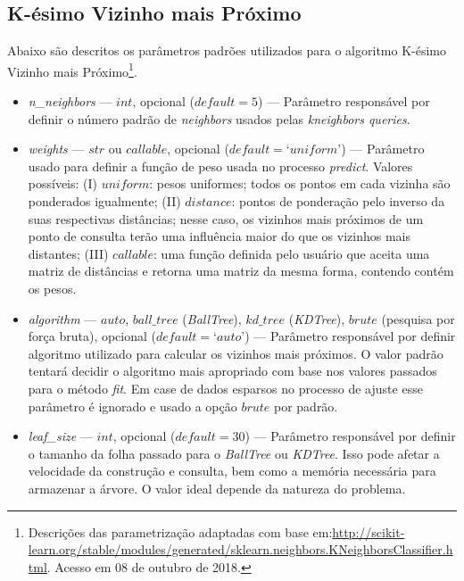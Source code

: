 \documentclass[
	12pt,				%
	oneside,			%
	a4paper,			%
	english,			%
	brazil				%
	]{abntex2ppgsi}
\begin{document}
{{{\begin{apendicesenv}
\section{K-ésimo Vizinho mais Próximo}

Abaixo são descritos os parâmetros padrões utilizados para o algoritmo K-ésimo Vizinho mais Próximo\footnote{Descrições das parametrização adaptadas com base em:\url{http://scikit-learn.org/stable/modules/generated/sklearn.neighbors.KNeighborsClassifier.html}. Acesso em 08 de outubro de 2018.}.

\begin{itemize}

\item \textit{n\_neighbors} --- $int$, opcional ($default = 5$) --- Parâmetro responsável por definir o número padrão de \textit{neighbors} usados pelas \textit{kneighbors queries}.

\item \textit{weights} --- $str$ ou $callable$, opcional ($default = ‘uniform’$) --- Parâmetro usado para definir a função de peso usada no processo \textit{predict}. Valores possíveis: (I) $uniform$: pesos uniformes; todos os pontos em cada vizinha são ponderados igualmente; (II) $distance$: pontos de ponderação pelo inverso da suas respectivas distâncias; nesse caso, os vizinhos mais próximos de um ponto de consulta terão uma influência maior do que os vizinhos mais distantes; (III) $callable$: uma função definida pelo usuário que aceita uma matriz de distâncias e retorna uma matriz da mesma forma, contendo contém os pesos.

\item \textit{algorithm} --- $auto$, $ball\_tree$ (\textit{BallTree}), $kd\_tree$ (\textit{KDTree}), $brute$ (pesquisa por força bruta), opcional ($default = ‘auto’$) --- Parâmetro responsável por definir algoritmo utilizado para calcular os vizinhos mais próximos. O valor padrão tentará decidir o algoritmo mais apropriado com base nos valores passados para o método \textit{fit}. Em case de dados esparsos no processo de ajuste esse parâmetro é ignorado e usado a opção $brute$ por padrão.

\item \textit{leaf\_size} --- $int$, opcional ($default = 30$) --- Parâmetro responsável por definir o tamanho da folha passado para o \textit{BallTree} ou \textit{KDTree}. Isso pode afetar a velocidade da construção e consulta, bem como a memória necessária para armazenar a árvore. O valor ideal depende da natureza do problema.


\end{itemize}
\end{apendicesenv}}}}
\end{document}
